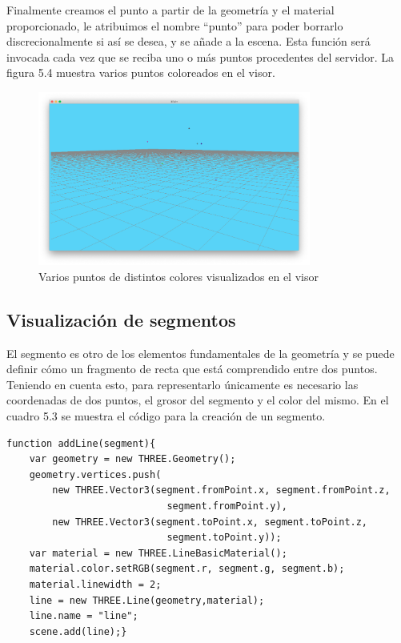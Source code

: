 Finalmente creamos el punto a partir de la geometría y el material proporcionado, le atribuimos el nombre ``punto'' para poder borrarlo discrecionalmente si así se desea, y se añade a la escena.
Esta función será invocada cada vez que se reciba uno o más puntos procedentes del servidor. La figura 5.4 muestra varios puntos coloreados en el visor.
\begin{figure}[H]
  \begin{center}
    \includegraphics[width=0.8\textwidth]{figures/visualizarpuntos.png}
		\caption{Varios puntos de distintos colores visualizados en el visor}
		\label{fig.visualizarpuntos}
		\end{center}
\end{figure}
\subsection{Visualización de segmentos}
El segmento es otro de los elementos fundamentales de la geometría y se puede definir cómo un fragmento de recta que está comprendido entre dos puntos. Teniendo en cuenta esto, para  representarlo únicamente es necesario las coordenadas de dos puntos, el grosor del segmento y el color del mismo. En el cuadro 5.3 se muestra el código para la creación de un segmento.


\begin{lstlisting}[caption= Creación y visualización de segmentos, label=cod.crearsegmento]
function addLine(segment){
	var geometry = new THREE.Geometry();
	geometry.vertices.push(
		new THREE.Vector3(segment.fromPoint.x, segment.fromPoint.z, 
							segment.fromPoint.y),
		new THREE.Vector3(segment.toPoint.x, segment.toPoint.z, 
							segment.toPoint.y));
	var material = new THREE.LineBasicMaterial();
	material.color.setRGB(segment.r, segment.g, segment.b);
	material.linewidth = 2;
	line = new THREE.Line(geometry,material);
	line.name = "line";
	scene.add(line);}
\end{lstlisting}

